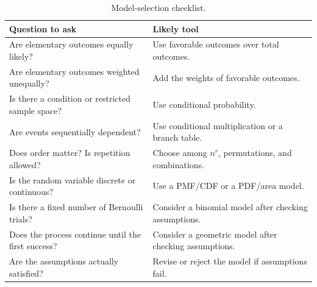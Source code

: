 \documentclass[11pt]{article}
\begin{document}
\begin{table}[ht]
\centering
\caption{Model-selection checklist.}\label{tab:model-selection}
\begin{tabularx}{\textwidth}{@{}lY@{}}
\toprule
Question to ask & Likely tool \\
\midrule
Are elementary outcomes equally likely? & Use favorable outcomes over total outcomes. \\
Are elementary outcomes weighted unequally? & Add the weights of favorable outcomes. \\
Is there a condition or restricted sample space? & Use conditional probability. \\
Are events sequentially dependent? & Use conditional multiplication or a branch table. \\
Does order matter? Is repetition allowed? & Choose among $n^r$, permutations, and combinations. \\
Is the random variable discrete or continuous? & Use a PMF/CDF or a PDF/area model. \\
Is there a fixed number of Bernoulli trials? & Consider a binomial model after checking assumptions. \\
Does the process continue until the first success? & Consider a geometric model after checking assumptions. \\
Are the assumptions actually satisfied? & Revise or reject the model if assumptions fail. \\
\bottomrule
\end{tabularx}
\end{table}
\end{document}
